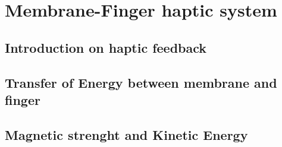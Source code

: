 \section{Membrane-Finger haptic system}


\subsection{Introduction on haptic feedback}

\subsection{Transfer of Energy between membrane and finger}

\subsection{Magnetic strenght and Kinetic Energy}